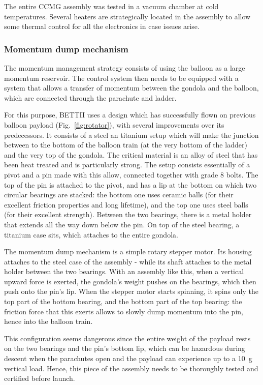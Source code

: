 The entire CCMG assembly was tested in a vacuum chamber at cold temperatures. Several heaters are strategically located in the assembly to allow some thermal control for all the electronics in case issues arise.

\subsubsection{Momentum dump mechanism}
\label{subsec:chap3momdumpmotor}

The momentum management strategy consists of using the balloon as a large momentum reservoir. The control system then needs to be equipped with a system that allows a transfer of momentum between the gondola and the balloon, which are connected through the parachute and ladder. 

For this purpose, BETTII uses a design which has successfully flown on previous balloon payload (Fig.~\ref{fig:rotator}), with several improvements over its predecessors. It consists of a steel an titanium setup which will make the junction between to the bottom of the balloon train (at the very bottom of the ladder) and the very top of the gondola. The critical material is an alloy of steel that has been heat treated and is particularly strong. The setup consists essentially of a pivot and a pin made with this allow, connected together with grade 8 bolts. The top of the pin is attached to the pivot, and has a lip at the bottom on which two circular bearings are stacked: the bottom one uses ceramic balls (for their excellent friction properties and long lifetime), and the top one uses steel balls (for their excellent strength). Between the two bearings, there is a metal holder that extends all the way down below the pin. On top of the steel bearing, a titanium case sits, which attaches to the entire gondola. 

The momentum dump mechanism is a simple rotary stepper motor. Its housing attaches to the steel case of the assembly - while its shaft attaches to the metal holder between the two bearings. With an assembly like this, when a vertical upward force is exerted, the gondola's weight pushes on the bearings, which then push onto the pin's lip. When the stepper motor starts spinning, it spins only the top part of the bottom bearing, and the bottom part of the top bearing: the friction force that this exerts allows to slowly dump momentum into the pin, hence into the balloon train. 

This configuration seems dangerous since the entire weight of the payload rests on the two bearings and the pin's bottom lip, which can be hazardous during descent when the parachutes open and the payload can experience up to a 10~g vertical load. Hence, this piece of the assembly needs to be thoroughly tested and certified before launch. 

